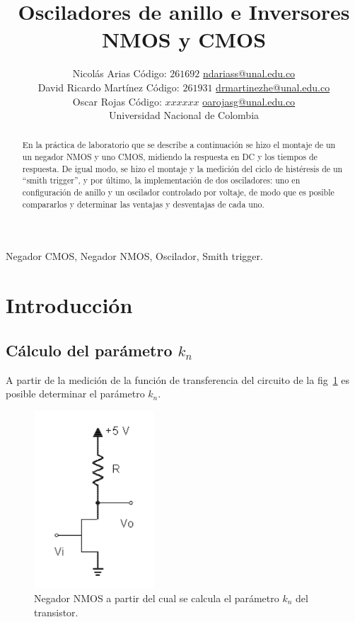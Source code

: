 \documentclass[twocolumn]{IEEEtran}
\begin{document}
\title{Osciladores de anillo e Inversores NMOS y CMOS}

\author{Nicolás Arias Código: $261692$ \url{ndariass@unal.edu.co}\\
	David Ricardo Martínez Código: $261931$ \url{drmartinezhe@unal.edu.co}\\
	Oscar Rojas Código: $xxxxxx$ \url{oarojasg@unal.edu.co}\\
	Universidad Nacional de Colombia}
\maketitle

\begin{abstract}
En la práctica de laboratorio que se describe a continuación se hizo el montaje de un un negador NMOS y uno CMOS, midiendo la respuesta en DC y los tiempos de respuesta. De igual modo, se hizo el montaje y la medición del ciclo de histéresis de un ``smith  trigger'', y por último, la implementación de dos osciladores: uno en configuración de anillo y un oscilador controlado por voltaje, de modo que es posible compararlos y determinar las ventajas y desventajas de cada uno.
\end{abstract}

\begin{keywords}
Negador CMOS, Negador NMOS, Oscilador, Smith trigger.
\end{keywords}

\section{Introducción}
\subsection{Cálculo del parámetro $k_n$}
A partir de la medición de la función de transferencia del circuito de la fig~\ref{introf1}  es posible determinar el parámetro $k_n$.

\begin{figure}[H]%
\centering
	\includegraphics[width=0.40\textwidth]{pics/intro1.png}
	\caption{Negador NMOS a partir del cual se calcula el parámetro $k_n$ del transistor.}
	
	\label{introf1}

\end{figure}
\end{document}
